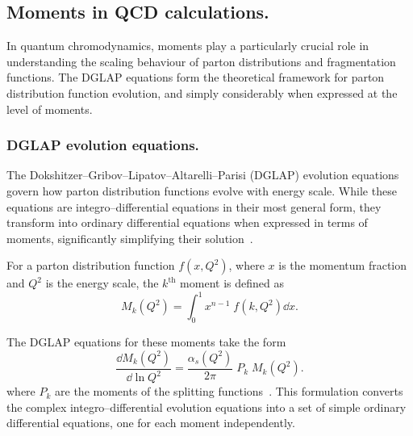     \subsection{Moments in QCD calculations.}
    
        In quantum chromodynamics, moments play a particularly crucial role in understanding the scaling behaviour of parton distributions and fragmentation functions.
        The DGLAP equations form the theoretical framework for parton distribution function evolution, and simply considerably when expressed at the level of moments.
        
        \subsubsection{DGLAP evolution equations.}
        
            The Dokshitzer--Gribov--Lipatov--Altarelli--Parisi (DGLAP) evolution equations~\cite{thomson_modern_2013, Altarelli:1977zs, dokshitzerCalculationStructureFunctions1977, gribovDeepInelasticEp1972} govern how parton distribution functions evolve with energy scale.
            While these equations are integro--differential equations in their most general form, they transform into ordinary differential equations when expressed in terms of moments, significantly simplifying their solution~\cite{Kotlorz:2014fia, Kotlorz:2006dj, Skands:2012ts, dissertori_quantum_2003, Altarelli:1981ax, alma9914845810606531, Gross:1973id, Gross:1973ju, Politzer:1973fx, Moch:2004pa, Vogt:2018ytw}.

            \begin{definition}
                For a parton distribution function $f(x,Q^2)$, where $x$ is the momentum fraction and $Q^2$ is the energy scale, the \(k^{\text{th}}\) moment is defined as
            \[
                M_k(Q^2) = \int_0^1 x^{n-1}\;f(k,Q^2) \dd x.
            \]
            
            The DGLAP equations for these moments take the form
            \[
            \frac{\dd M_k(Q^2)}{\dd \ln Q^2} = \frac{\alpha_s(Q^2)}{2\pi}\; P_k\;M_k(Q^2).
            \]
            where $P_k$ are the moments of the splitting functions~\cite{Ellis:1996mzs, salam_elements_2011, Schoeffel:1998tz, Strozik-Kotlorz:2014xga, Simonelli:2024vyh}.
            This formulation converts the complex integro--differential evolution equations into a set of simple ordinary differential equations, one for each moment independently.
            \end{definition}
